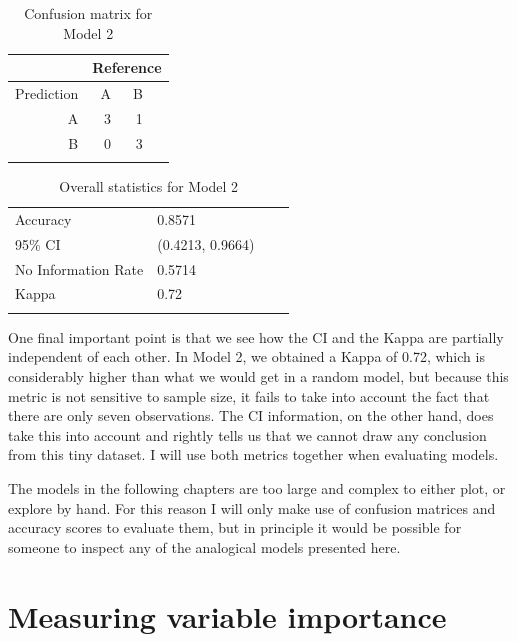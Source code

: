 \begin{table}[!htpb]
  \centering
  \begin{tabular}{rrrr}
    \lsptoprule
               & \multicolumn{3}{c}{Reference} \\
    \midrule
    Prediction & A  & B                        \\
    A          & 3  & 1                        \\
    B          & 0  & 3                        \\
    \lspbottomrule
  \end{tabular}
  \caption{Confusion matrix for Model 2}\label{tab:model2-conf}
\end{table}

\begin{table}[!htpb]
  \centering
  \begin{tabular}{llrr}
    \lsptoprule
    \multicolumn{2}{c}{Overall statistics:} \\

    \midrule
    Accuracy            & 0.8571            \\
    95\% CI             & (0.4213, 0.9664)  \\
    No Information Rate & 0.5714            \\
    Kappa               & 0.72              \\
    \lspbottomrule
  \end{tabular}
  \caption{Overall statistics for Model 2}\label{tab:stats-model2}
\end{table}

\newpage 
One final important point is that we see how the CI and the Kappa are partially independent of each other. In Model 2, we obtained a Kappa of 0.72, which is considerably higher than what we would get in a random model, but because this metric is not sensitive to sample size, it fails to take into account the fact that there are only seven observations. The CI information, on the other hand, does take this into account and rightly tells us that we cannot draw any conclusion from this tiny dataset. I will use both metrics together when evaluating models.

The models in the following chapters are too large and complex to either plot, or explore by hand. For this reason I will only make use of confusion matrices and accuracy scores to evaluate them, but in principle it would be possible for someone to inspect any of the analogical models presented here.

\section{Measuring variable importance}

